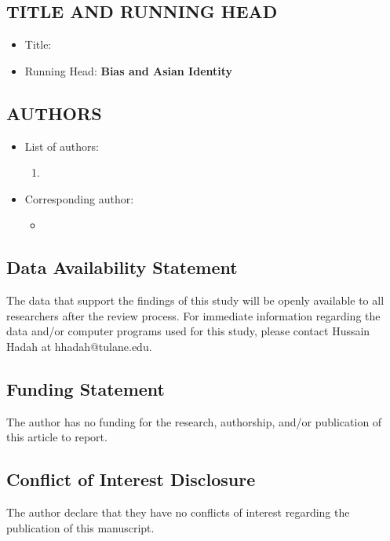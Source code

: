 \documentclass[12pt,english]{article}
\begin{document}
\subsection*{TITLE AND RUNNING HEAD}
\begin{itemize}[label={}, leftmargin=*]
    \item Title: \textbf{\PAPERTITLE}
    \item Running Head:  \textbf{Bias and Asian Identity}
\end{itemize}
\subsection*{AUTHORS}
\begin{itemize}[label={}, leftmargin=*]
    \item List of authors:
    \begin{enumerate}
        \item \AUTHORHADAHINFO
    \end{enumerate}
    \item Corresponding author:
    \begin{itemize}
        \item \textbf{\AUTHORHADAHINFO}
    \end{itemize}
\end{itemize}

\subsection*{Data Availability Statement}
The data that support the findings of this study will be openly available to all researchers after the review process. For immediate information regarding the data and/or computer programs used for this study, please contact Hussain Hadah at hhadah@tulane.edu.

\subsection*{Funding Statement}

The author has no funding for the research, authorship, and/or publication of this article to report.

\subsection*{Conflict of Interest Disclosure}
The author declare that they have no conflicts of interest regarding the publication of this manuscript.
\end{document}
